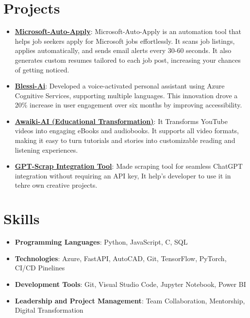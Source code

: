 \documentclass[letterpaper,11pt]{article}
\newcommand{\resumeItem}[2]{
  \item\small{
    \textbf{#1}{: #2 \vspace{-2pt}}
  }
}
\newcommand{\resumeSubItem}[2]{\resumeItem{#1}{#2}\vspace{-4pt}}
\newcommand{\resumeSubHeadingListStart}{\begin{itemize}[leftmargin=*]}
\newcommand{\resumeSubHeadingListEnd}{\end{itemize}}
\begin{document}
\section{Projects}
  \resumeSubHeadingListStart
    \resumeSubItem{\href{https://github.com/kashifalikhan36/MIcrosoft_autoearly_apply}{Microsoft-Auto-Apply}}
      {Microsoft-Auto-Apply is an automation tool that helps job seekers apply for Microsoft jobs effortlessly. It scans job listings, applies automatically, and sends email alerts every 30-60 seconds. It also generates custom resumes tailored to each job post, increasing your chances of getting noticed.}
      
    \resumeSubItem{\href{https://youtu.be/OyDJ7AkI3zU}{Blessi-Ai}}
      {Developed a voice-activated personal assistant using Azure Cognitive Services, supporting multiple languages. This innovation drove a 20\% increase in user engagement over six months by improving accessibility.}
      
    \resumeSubItem{\href{https://youtu.be/9uK548bL858}{Awaiki-AI (Educational Transformation)}}
      {It Transforms YouTube videos into engaging eBooks and audiobooks. It supports all video formats, making it easy to turn tutorials and stories into customizable reading and listening experiences.}
    \resumeSubItem{\href{https://github.com/kashifalikhan36/Gpt-Scrap}{GPT-Scrap Integration Tool}}
      {Made scraping tool for seamless ChatGPT integration without requiring an API key, It help's developer to use it in tehre own creative projects.}
  \resumeSubHeadingListEnd


\section{Skills}
 \resumeSubHeadingListStart
   \item \textbf{Programming Languages}: Python, JavaScript, C, SQL
   \item \textbf{Technologies}: Azure, FastAPI, AutoCAD, Git, TensorFlow, PyTorch, CI/CD Pinelines
   \item \textbf{Development Tools}: Git, Visual Studio Code, Jupyter Notebook, Power BI
   \item \textbf{Leadership and Project Management}: Team Collaboration, Mentorship, Digital Transformation
 \resumeSubHeadingListEnd


\end{document}
